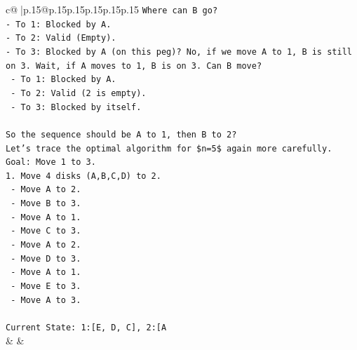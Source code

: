 \documentclass{article}
\begin{document}
{\begin{supertabular}{c@{$\;$}|p{.15\linewidth}@{}p{.15\linewidth}p{.15\linewidth}p{.15\linewidth}p{.15\linewidth}p{.15\linewidth}}
{{{\texttt{Where can B go?} \\
\texttt{{-} To 1: Blocked by A.} \\
\texttt{{-} To 2: Valid (Empty).} \\
\texttt{{-} To 3: Blocked by A (on this peg)? No, if we move A to 1, B is still on 3. Wait, if A moves to 1, B is on 3. Can B move?} \\
\texttt{  {-} To 1: Blocked by A.} \\
\texttt{  {-} To 2: Valid (2 is empty).} \\
\texttt{  {-} To 3: Blocked by itself.} \\
\\ 
\texttt{So the sequence should be A to 1, then B to 2?} \\
\texttt{Let's trace the optimal algorithm for \$n=5\$ again more carefully.} \\
\texttt{Goal: Move 1 to 3.} \\
\texttt{1. Move 4 disks (A,B,C,D) to 2.} \\
\texttt{   {-} Move A to 2.} \\
\texttt{   {-} Move B to 3.} \\
\texttt{   {-} Move A to 1.} \\
\texttt{   {-} Move C to 3.} \\
\texttt{   {-} Move A to 2.} \\
\texttt{   {-} Move D to 3.} \\
\texttt{   {-} Move A to 1.} \\
\texttt{   {-} Move E to 3.} \\
\texttt{   {-} Move A to 3.} \\
\\ 
\texttt{Current State: 1:{[}E, D, C{]}, 2:{[}A} \\
            }
        }
    }
    & & \\ \\


\end{supertabular}}
\end{document}
